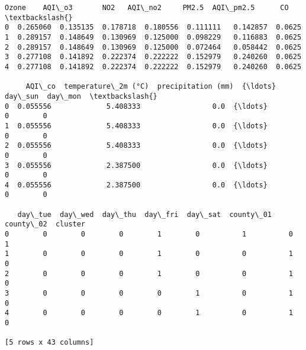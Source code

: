 \documentclass[11pt]{article}
\makeatletter
\newcommand{\boxspacing}{\kern\kvtcb@left@rule\kern\kvtcb@boxsep}
\newcommand{\prompt}[4]{
        {\ttfamily\llap{{\color{#2}[#3]:\hspace{3pt}#4}}\vspace{-\baselineskip}}
    }
\makeatother
\begin{document}
            \begin{tcolorbox}[breakable, size=fbox, boxrule=.5pt, pad at break*=1mm, opacityfill=0]
\prompt{Out}{outcolor}{40}{\boxspacing}
\begin{Verbatim}[commandchars=\\\{\}]
      Ozone    AQI\_o3       NO2   AQI\_no2     PM2.5  AQI\_pm2.5      CO  \textbackslash{}
0  0.265060  0.135135  0.178718  0.180556  0.111111   0.142857  0.0625
1  0.289157  0.148649  0.130969  0.125000  0.098229   0.116883  0.0625
2  0.289157  0.148649  0.130969  0.125000  0.072464   0.058442  0.0625
3  0.277108  0.141892  0.222374  0.222222  0.152979   0.240260  0.0625
4  0.277108  0.141892  0.222374  0.222222  0.152979   0.240260  0.0625

     AQI\_co  temperature\_2m (°C)  precipitation (mm)  {\ldots}  day\_sun  day\_mon  \textbackslash{}
0  0.055556             5.408333                 0.0  {\ldots}        0        0
1  0.055556             5.408333                 0.0  {\ldots}        0        0
2  0.055556             5.408333                 0.0  {\ldots}        0        0
3  0.055556             2.387500                 0.0  {\ldots}        0        0
4  0.055556             2.387500                 0.0  {\ldots}        0        0

   day\_tue  day\_wed  day\_thu  day\_fri  day\_sat  county\_01  county\_02  cluster
0        0        0        0        1        0          1          0        1
1        0        0        0        1        0          0          1        0
2        0        0        0        1        0          0          1        0
3        0        0        0        0        1          0          1        0
4        0        0        0        0        1          0          1        0

[5 rows x 43 columns]
\end{Verbatim}
\end{tcolorbox}
        
\end{document}
